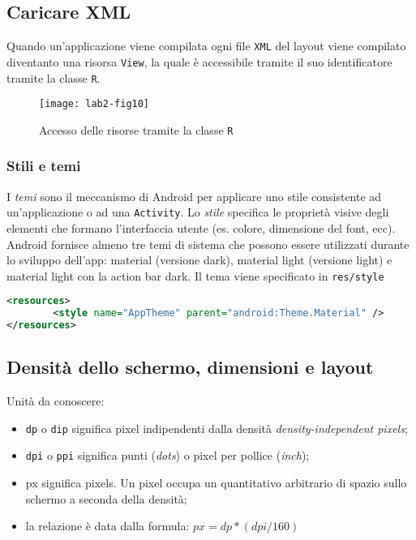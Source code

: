 \subsection{Caricare XML}

Quando un'applicazione viene compilata ogni file \texttt{XML} del layout viene
compilato diventanto una risorsa \texttt{View}, la quale è accessibile tramite
il suo identificatore tramite la classe \texttt{R}.

\begin{figure*}[htbp]
        \centering
        \texttt{[image: lab2-fig10]}
        \caption[Accesso risorse R]{Accesso delle risorse tramite la classe
\texttt{R}}
        \label{img:lab2-fig10}
\end{figure*}

\subsubsection{Stili e temi}

I \textit{temi} sono il meccanismo di Android per applicare uno stile
consistente ad un'applicazione o ad una \texttt{Activity}. Lo \textit{stile}
specifica le proprietà visive degli elementi che formano l'interfaccia utente
(es. colore, dimensione del font, ecc).
Android fornisce almeno tre temi di sistema che possono essere utilizzati
durante lo sviluppo dell'app: material (versione dark), material light (versione
light) e material light con la action bar dark. Il tema viene specificato in
\texttt{res/style}

\begin{lstlisting}[language=XML, basicstyle=\footnotesize]
<resources>
        <style name="AppTheme" parent="android:Theme.Material" />
</resources>
\end{lstlisting}

\subsection{Densità dello schermo, dimensioni e layout}

Unità da conoscere:
\begin{itemize}
\item \texttt{dp} o \texttt{dip} significa pixel indipendenti dalla densità
\textit{density-independent pixels};
\item \texttt{dpi} o \texttt{ppi} significa punti (\textit{dots}) o pixel per
pollice (\textit{inch});
\item px significa pixels. Un pixel occupa un quantitativo arbitrario di spazio
sullo schermo a seconda della densità;
\item la relazione è data dalla formula: $px = dp * (dpi/160)$
\end{itemize}


